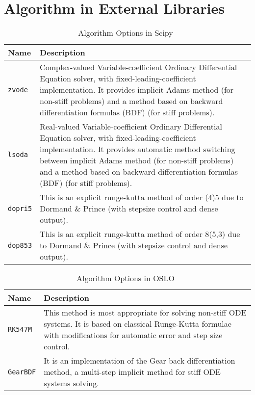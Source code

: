 	


\section{Algorithm in External Libraries}
\label{alg_externallib}

\begin{table}[ht]
\begin{tabular}{ p{} p{} }
	\textbf{Name} & \textbf{Description} \\
	\toprule
	\verb|zvode| & Complex-valued Variable-coefficient Ordinary Differential Equation solver, with fixed-leading-coefficient implementation. It provides implicit Adams method (for non-stiff problems) and a method based on backward differentiation formulas (BDF) (for stiff problems).\\ \hline
	\verb|lsoda| & Real-valued Variable-coefficient Ordinary Differential Equation solver, with fixed-leading-coefficient implementation. It provides automatic method switching between implicit Adams method (for non-stiff problems) and a method based on backward differentiation formulas (BDF) (for stiff problems).\\ \hline
	\verb|dopri5| & This is an explicit runge-kutta method of order (4)5 due to Dormand \& Prince (with stepsize control and dense output).\\ \hline
	\verb|dop853| & This is an explicit runge-kutta method of order 8(5,3) due to Dormand \& Prince (with stepsize control and dense output).\\
	\bottomrule	
\end{tabular}	
\caption{Algorithm Options in Scipy~\citep{scipyfun}}	
\label{tab_algscipy}
\end{table}

\begin{table}[ht]
\begin{tabular}{ p{} p{} }
	\textbf{Name} & \textbf{Description} \\
	\toprule
	\verb|RK547M| & This method is most appropriate for solving non-stiff ODE systems. It is based on classical Runge-Kutta formulae with modifications for automatic error and step size control.\\ \hline
	\verb|GearBDF| & It is an implementation of the Gear back differentiation method, a multi-step implicit method for stiff ODE systems solving.\\
	\bottomrule	
\end{tabular}	
\caption{Algorithm Options in OSLO~\citep{oslofun}}	
\label{tab_algodeint}
\end{table}

